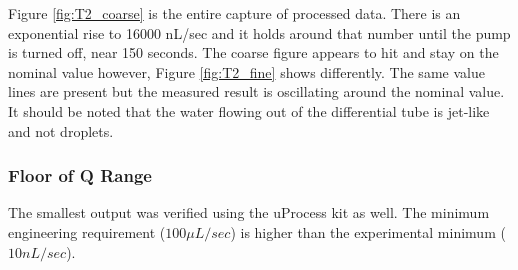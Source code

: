 \documentclass[journal]{IEEEtran}
\begin{document}
                Figure \ref{fig:T2_coarse} is the entire capture of processed data. There is an exponential rise to 16000 nL/sec and it holds around that number until the pump is turned off, near 150 seconds. The coarse figure appears to hit and stay on the nominal value however, Figure \ref{fig:T2_fine} shows differently. The same value lines are present but the measured result is oscillating around the nominal value. It should be noted that the water flowing out of the differential tube is jet-like and not droplets. 
                

                
        \subsubsection{Floor of Q Range}
        
            The smallest output was verified using the uProcess kit as well. The minimum engineering requirement (\( 100\mu L/sec\)) is higher than the experimental minimum (\( 10 nL/sec\)).
        
\end{document}
